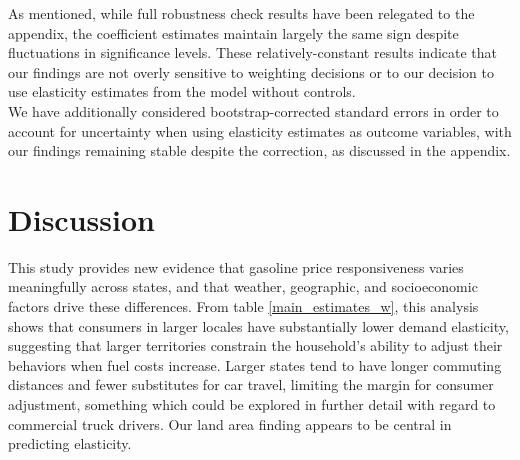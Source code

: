 \documentclass[12pt,a4paper]{article}
\begin{document}
\begin{table}[H]
	\begin{center}
		
		\label{demographic_estimates_w}
		\caption[Demographic Predictor Estimates, Weighted]{More dense populations and states with larger border-shares have higher elasticity, while states with higher drivers license rates are relatively inelastic.}
	\end{center}
\end{table}

\begin{table}[H]
	\begin{center}
		
		\label{pop_share_estimates_w}
		\caption[Cheaper Gas Border Predictor Estimates, Weighted]{Further exploring border county populations with cross-state prices in mind, our estimates suggest that not only does border density influence customer responsiveness, which side of the border is cheaper matters as well.}
	\end{center}
\end{table}

As mentioned, while full robustness check results have been relegated to the appendix, the coefficient estimates maintain largely the same sign despite fluctuations in significance levels. These relatively-constant results indicate that our findings are not overly sensitive to weighting decisions or to our decision to use elasticity estimates from the model without controls. \\

We have additionally considered bootstrap-corrected standard errors in order to account for uncertainty when using elasticity estimates as outcome variables, with our findings remaining stable despite the correction, as discussed in the appendix. 

\section{Discussion}
This study provides new evidence that gasoline price responsiveness varies meaningfully across states, and that weather, geographic, and socioeconomic factors drive these differences. From table \ref{main_estimates_w}, this analysis shows that consumers in larger locales have substantially lower demand elasticity, suggesting that larger territories constrain the household's ability to adjust their behaviors when fuel costs increase. Larger states tend to have longer commuting distances and fewer substitutes for car travel, limiting the margin for consumer adjustment, something which could be explored in further detail with regard to commercial truck drivers. Our land area finding appears to be central in predicting elasticity. \\
\end{document}

